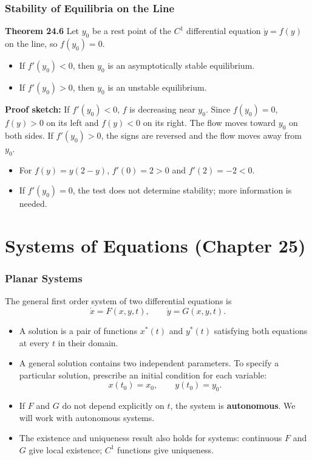 \documentclass[9pt,aspectratio=169]{beamer}
\begin{document}
\begin{frame}
    \frametitle{Stability of Equilibria on the Line}
    \begin{block}{\textbf{Theorem 24.6}}
        Let $y_0$ be a rest point of the $C^1$ differential equation
        $\dot y=f(y)$ on the line, so $f(y_0)=0$.
        \begin{itemize}
            \item If $f'(y_0)<0$, then $y_0$ is an asymptotically stable
            equilibrium.
            \item If $f'(y_0)>0$, then $y_0$ is an unstable equilibrium.
        \end{itemize}
    \end{block}
    \textbf{Proof sketch:} If $f'(y_0)<0$, $f$ is decreasing near $y_0$.
    Since $f(y_0)=0$, $f(y)>0$ on its left and $f(y)<0$ on its right.
    The flow moves toward $y_0$ on both sides. If $f'(y_0)>0$, the signs
    are reversed and the flow moves away from $y_0$.
    \begin{itemize}
        \item For $f(y)=y(2-y)$, $f'(0)=2>0$ and $f'(2)=-2<0$.
        \item If $f'(y_0)=0$, the test does not determine stability;
        more information is needed.
    \end{itemize}
\end{frame}

\section{Systems of Equations (Chapter 25)}

\begin{frame}
    \frametitle{Planar Systems}
    The general first order system of two differential equations is
    \[
        \dot x=F(x,y,t),\qquad \dot y=G(x,y,t).
    \]
    \begin{itemize}
        \item A solution is a pair of functions $x^*(t)$ and $y^*(t)$
        satisfying both equations at every $t$ in their domain.
        \item A general solution contains two independent parameters.
        To specify a particular solution, prescribe an initial condition
        for each variable:
        \[
            x(t_0)=x_0,\qquad y(t_0)=y_0.
        \]
        \item If $F$ and $G$ do not depend explicitly on $t$, the system
        is \textbf{autonomous}. We will work with autonomous systems.
        \item The existence and uniqueness result also holds for
        systems: continuous $F$ and $G$ give local existence; $C^1$
        functions give uniqueness.
    \end{itemize}
\end{frame}
\end{document}
